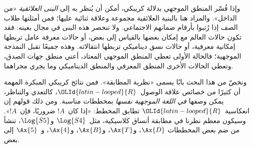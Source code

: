 \documentclass[../../../include/open-logic-section]{subfiles}
\begin{document}
وإذا فُسّر المنطق الموجهي بدلالة كريبكي، أمكن أن يُنظر به إلى
\emph{البنى العلائقية} «من الداخل». والمراد هنا بالبنية العلائقية
مجموعة وعلاقة ثنائية عليها؛ فمن أمثلتها طلاب الصف إذا رُتبوا بأرقام
ضمانهم الاجتماعي. ولا تنحصر هذه البنى في مجال بعينه: فقد تكون حالات
العالم مع إمكان بعضها بالقياس إلى بعض، أو حالات معرفة عامل تربطها
إمكانية معرفية، أو حالات نسق ديناميكي تربطها انتقالاته. وهذه جميعًا
تقبل النمذجة الموجهية؛ فالحالة الأولى تعطي المنطق الموجهي المعتاد،
أعني منطق جهات الصدق، وتعطي الحالات الأخرى المنطق المعرفي والمنطق
الديناميكي وما يجري مجراهما.

ونخصّ من هذا البحث بابًا يسمى «نظرية المطابقة». فمن نتائج كريبكي
المبكرة المهمة أن كثيرًا من خصائص علاقة الوصول~${\OLId{latin-looped}{R}}$، كالتعدي
والتناظر، يمكن وصفها \emph{في اللغة الموجهية نفسها} بمخططات مناسبة.
ومن ذلك قولهم إن انعكاسية~${\OLId{latin-looped}{R}}$ تطابق المخطط: «إذا كان~$!A$
ضروريًا، فإن~$!A$». وسيكون معظم نظرنا في مطابقة أنساق كلاسيكية،
مثل~$\Log{S4}$ و$\Log{S5}$، تنشأ من ضم بعض المخططات
$\Ax{D}$، و$\Ax{T}$، و$\Ax{B}$، و$\Ax{4}$، و~$\Ax{5}$ إلى بعض.
\end{document}
